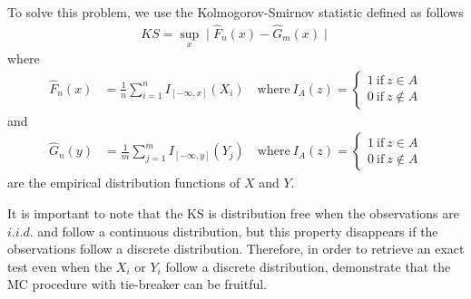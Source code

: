 \documentclass[11pt]{article}\usepackage[]{graphicx}\usepackage[]{color}
\begin{document}
To solve this problem, we use the Kolmogorov-Smirnov statistic \citep{smirnoff_sur_1939,smirnov_table_1948} defined as follows
 \begin{align}
	KS = \sup_x \mid\hat{F}_{n}(x) - \hat{G}_{m}(x)\mid
	\end{align}
	where
	\begin{align}
	\hat{F}_{n}(x) & =\frac{1}{n}\sum_{i=1}^{n}I_{[-\infty,x]}(X_i) \quad \mathrm{where} \ I_{A}(z)=\left\{\begin{array}{l}
		1\ \mathrm{if}\ z\in A\\
		0\ \mathrm{if}\ z\not\in A
	\end{array}\right.
	\end{align}
	and
	\begin{align}
	\hat{G}_{n}(y) & =\frac{1}{m}\sum_{j=1}^{m}I_{[-\infty,y]}(Y_j) \quad \mathrm{where} \ I_{A}(z)=\left\{\begin{array}{l}
		1\ \mathrm{if}\ z\in A\\
		0\ \mathrm{if}\ z\not\in A
	\end{array}\right.
	\end{align}
	are the empirical distribution functions of $X$ and $Y$.

	It is important to note that the KS is distribution free when the observations are $i.i.d.$ and follow a continuous distribution, but this property disappears if the observations follow a discrete distribution. Therefore, in order to retrieve an exact test even when the $X_i$ or $Y_i$ follow a discrete distribution, \cite{dufour_exact_2001} demonstrate that the MC procedure with tie-breaker can be fruitful.
\end{document}
